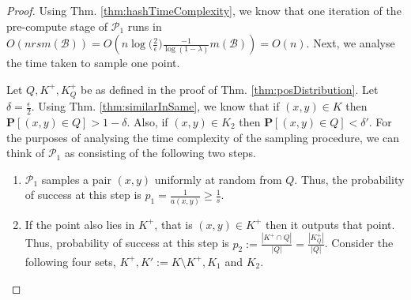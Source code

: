 \documentclass[12pt]{article}
\newcommand{\mb}{\mathbf}
\newcommand{\mc}{\mathcal}
\begin{document}
\begin{proof}
Using Thm. \ref{thm:hashTimeComplexity}, we know that one iteration of the pre-compute stage of $\mc P_1$ runs in $O(n r s m(\mc B)) = O(n\log \big(\frac{2}{\epsilon}\big)\frac{-1}{\log(1-\lambda)} m(\mc B)) = O(n)$. Next, we analyse the time taken to sample one point.  

Let $Q, K^+, K_Q^+$ be as defined in the proof of Thm. \ref{thm:posDistribution}. Let $\delta = \frac{\epsilon}{2}$. Using Thm. \ref{thm:similarInSame}, we know that if $(x, y) \in K$ then $\mb P[(x, y) \in Q] > 1-\delta$. Also, if $(x, y) \in K_2$ then $\mb P[(x, y) \in Q] < \delta'$. For the purposes of analysing the time complexity of the sampling procedure, we can think of $\mc P_1$ as consisting of the following two steps. 
\begin{enumerate}[label=\textbf{T.\arabic*}]
  \item $\mc P_1$ samples a pair $(x, y)$ uniformly at random from $Q$. Thus, the probability of success at this step is $p_1 = \frac{1}{a(x, y)} \ge \frac{1}{s}$. 
  \item If the point also lies in $K^+$, that is $(x, y) \in K^+$ then it outputs that point. Thus, probability of success at this step is $p_2 := \frac{|K^+ \cap Q|}{|Q|} = \frac{|K^+_Q|}{|Q|}$. Consider the following four sets, $K^+, K' := K\setminus K^+, K_1$ and $K_2$. 


\end{enumerate}
\end{proof}
\end{document}
